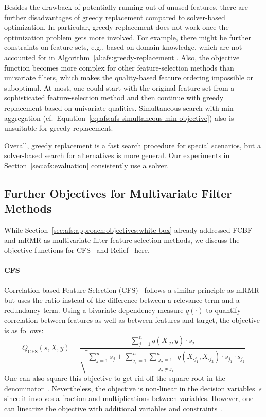 \documentclass{article}
\theoremstyle{definition}
\begin{document}
Besides the drawback of potentially running out of unused features, there are further disadvantages of greedy replacement compared to solver-based optimization.
In particular, greedy replacement does not work once the optimization problem gets more involved.
For example, there might be further constraints on feature sets, e.g., based on domain knowledge, which are not accounted for in Algorithm~\ref{al:afs:greedy-replacement}.
Also, the objective function becomes more complex for other feature-selection methods than univariate filters, which makes the quality-based feature ordering impossible or suboptimal.
At most, one could start with the original feature set from a sophisticated feature-selection method and then continue with greedy replacement based on univariate qualities.
Simultaneous search with min-aggregation (cf.~Equation~\ref{eq:afs:afs-simultaneous-min-objective}) also is unsuitable for greedy replacement.

Overall, greedy replacement is a fast search procedure for special scenarios, but a solver-based search for alternatives is more general.
Our experiments in Section~\ref{sec:afs:evaluation} consistently use a solver.

\subsection{Further Objectives for Multivariate Filter Methods}
\label{sec:afs:appendix:multivariate-filter-objectives}

While Section~\ref{sec:afs:approach:objectives:white-box} already addressed FCBF and mRMR as multivariate filter feature-selection methods, we discuss the objective functions for CFS~\cite{hall1999correlation, hall2000correlation} and Relief~\cite{kira1992feature, robnik1997adaptation} here.

\paragraph{CFS}

Correlation-based Feature Selection (CFS)~\cite{hall1999correlation, hall2000correlation} follows a similar principle as mRMR but uses the ratio instead of the difference between a relevance term and a redundancy term.
Using a bivariate dependency measure $q(\cdot)$ to quantify correlation between features as well as between features and target, the objective is as follows:
%
\begin{equation}
	Q_{\text{CFS}}(s,X,y) = \frac{\sum_{j=1}^{n} q(X_{\cdot{}j},y) \cdot s_j}{\sqrt{\sum_{j=1}^{n} s_j + \sum_{j_1=1}^{n} \sum_{\substack{j_2=1 \\ j_2 \neq j_1}}^{n} q(X_{\cdot{}j_1}, X_{\cdot{}j_2}) \cdot s_{j_1} \cdot s_{j_2}}}
	\label{eq:afs:cfs}
\end{equation}
%
One can also square this objective to get rid off the square root in the denominator~\cite{nguyen2010towards}.
Nevertheless, the objective is non-linear in the decision variables~$s$ since it involves a fraction and multiplications between variables.
However, one can linearize the objective with additional variables and constraints~\cite{nguyen2010improving, nguyen2010towards}.
\end{document}
